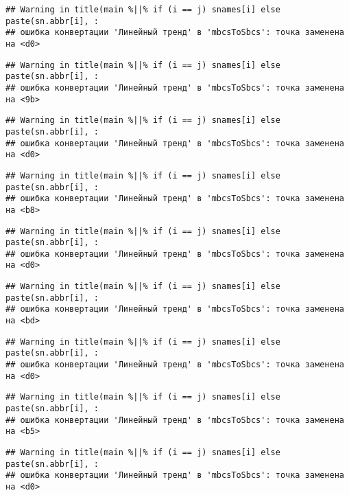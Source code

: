 \documentclass[
]{article}
\begin{document}
\begin{verbatim}
## Warning in title(main %||% if (i == j) snames[i] else paste(sn.abbr[i], :
## ошибка конвертации 'Линейный тренд' в 'mbcsToSbcs': точка заменена на <d0>
\end{verbatim}

\begin{verbatim}
## Warning in title(main %||% if (i == j) snames[i] else paste(sn.abbr[i], :
## ошибка конвертации 'Линейный тренд' в 'mbcsToSbcs': точка заменена на <9b>
\end{verbatim}

\begin{verbatim}
## Warning in title(main %||% if (i == j) snames[i] else paste(sn.abbr[i], :
## ошибка конвертации 'Линейный тренд' в 'mbcsToSbcs': точка заменена на <d0>
\end{verbatim}

\begin{verbatim}
## Warning in title(main %||% if (i == j) snames[i] else paste(sn.abbr[i], :
## ошибка конвертации 'Линейный тренд' в 'mbcsToSbcs': точка заменена на <b8>
\end{verbatim}

\begin{verbatim}
## Warning in title(main %||% if (i == j) snames[i] else paste(sn.abbr[i], :
## ошибка конвертации 'Линейный тренд' в 'mbcsToSbcs': точка заменена на <d0>
\end{verbatim}

\begin{verbatim}
## Warning in title(main %||% if (i == j) snames[i] else paste(sn.abbr[i], :
## ошибка конвертации 'Линейный тренд' в 'mbcsToSbcs': точка заменена на <bd>
\end{verbatim}

\begin{verbatim}
## Warning in title(main %||% if (i == j) snames[i] else paste(sn.abbr[i], :
## ошибка конвертации 'Линейный тренд' в 'mbcsToSbcs': точка заменена на <d0>
\end{verbatim}

\begin{verbatim}
## Warning in title(main %||% if (i == j) snames[i] else paste(sn.abbr[i], :
## ошибка конвертации 'Линейный тренд' в 'mbcsToSbcs': точка заменена на <b5>
\end{verbatim}

\begin{verbatim}
## Warning in title(main %||% if (i == j) snames[i] else paste(sn.abbr[i], :
## ошибка конвертации 'Линейный тренд' в 'mbcsToSbcs': точка заменена на <d0>
\end{verbatim}
\end{document}
